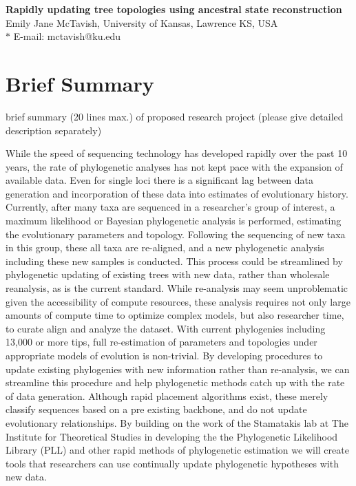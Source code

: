 \documentclass[10pt]{article}
\date{}
\begin{document}
\begin{flushleft}
{\Large
\textbf{Rapidly updating tree topologies using ancestral state reconstruction}
}
\\
Emily Jane McTavish, University of Kansas, Lawrence KS, USA
\\

$\ast$ E-mail: mctavish@ku.edu
\end{flushleft}

\section*{Brief Summary}

brief summary (20 lines max.) of proposed research project (please give detailed description separately)

While the speed of sequencing technology has developed rapidly over the past 10 years, the rate of phylogenetic analyses has not kept pace with the expansion of available data. Even for single loci there is a significant lag between data generation and incorporation of these data into estimates of evolutionary history. Currently, after many taxa are sequenced in a researcher's group of interest, a  maximum likelihood or Bayesian phylogenetic analysis is performed, estimating the evolutionary parameters and topology. Following the sequencing of new taxa in this group, these all taxa are re-aligned, and a new phylogenetic analysis including these new samples is conducted. This process could be streamlined by phylogenetic updating of existing trees with new data, rather than wholesale reanalysis, as is the current standard. While re-analysis may seem unproblematic given the accessibility of compute resources, these analysis requires not only large amounts of compute time to optimize complex models, but also researcher time, to curate align and analyze the dataset. With current phylogenies including 13,000 \cite{smith_rates_2008} or more tips, full re-estimation of parameters and topologies under appropriate models of evolution is non-trivial.  By developing procedures to update existing phylogenies with new information rather than re-analysis, we can streamline this procedure and help phylogenetic methods catch up with the rate of data generation. Although rapid placement algorithms exist, these merely classify sequences based on a pre existing backbone, and do not update evolutionary relationships. By building on the work of the Stamatakis lab at The Institute for Theoretical Studies in developing the the Phylogenetic Likelihood Library (PLL) and other rapid methods of phylogenetic estimation we will create tools that researchers can use continually update phylogenetic hypotheses with new data.
\end{document}
